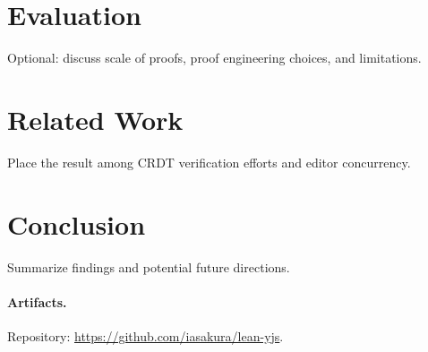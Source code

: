\documentclass[11pt]{article}
\theoremstyle{plain}
\theoremstyle{definition}
\theoremstyle{remark}
\begin{document}
\section{Evaluation}
Optional: discuss scale of proofs, proof engineering choices, and limitations.

\section{Related Work}
Place the result among CRDT verification efforts and editor concurrency.

\section{Conclusion}
Summarize findings and potential future directions.

\paragraph{Artifacts.} Repository: \url{https://github.com/iasakura/lean-yjs}.



\end{document}
